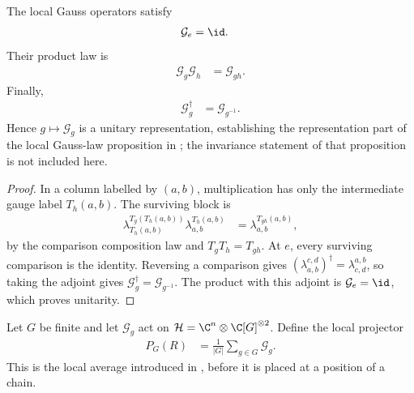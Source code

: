 \begin{lemma}
    \label{thm:mpug_gauss_representation}
    \leanok
    The local Gauss operators satisfy
    \begin{align}
        \mathcal G_e & =\id.
    \end{align}
    Their product law is
    \begin{align}
        \mathcal G_g\mathcal G_h & =\mathcal G_{gh}.
        \label{eq:mpug_gauss_representation}
    \end{align}
    Finally,
    \begin{align}
        \mathcal G_g^\dagger & =\mathcal G_{g^{-1}}.
    \end{align}
    Hence $g\mapsto\mathcal G_g$ is a unitary representation, establishing the
    representation part of the local Gauss-law proposition in
    \cite[lines~3380--3387]{FrancoRubio2025MPUGauging}; the invariance
    statement of that proposition is not included here.
\end{lemma}

\begin{proof}\leanok
    In a column labelled by $(a,b)$, multiplication has only the intermediate
    gauge label $T_h(a,b)$. The surviving block is
    \begin{align}
        \lambda_{T_h(a,b)}^{T_g(T_h(a,b))}
        \lambda_{a,b}^{T_h(a,b)}
         & =\lambda_{a,b}^{T_{gh}(a,b)},
    \end{align}
    by the comparison composition law and
    $T_gT_h=T_{gh}$. At $e$, every surviving comparison is the identity.
    Reversing a comparison gives
    $(\lambda_{a,b}^{c,d})^\dagger=\lambda_{c,d}^{a,b}$, so taking the adjoint
    gives $\mathcal G_g^\dagger=\mathcal G_{g^{-1}}$. The product with this
    adjoint is $\mathcal G_e=\id$, which proves unitarity.
\end{proof}

\begin{definition}
    \label{def:mpug_gauss_projector}
    \leanok
    Let $G$ be finite and let $\mathcal G_g$ act on
    $\mathcal H=\C^n\otimes\C[G]^{\otimes2}$. Define the local projector
    \begin{align}
        P_G(R) & =\frac{1}{|G|}\sum_{g\in G}\mathcal G_g.
        \label{eq:mpug_gauss_projector}
    \end{align}
    This is the local average introduced in
    \cite[lines~3494--3499]{FrancoRubio2025MPUGauging}, before it is placed
    at a position of a chain.
\end{definition}

